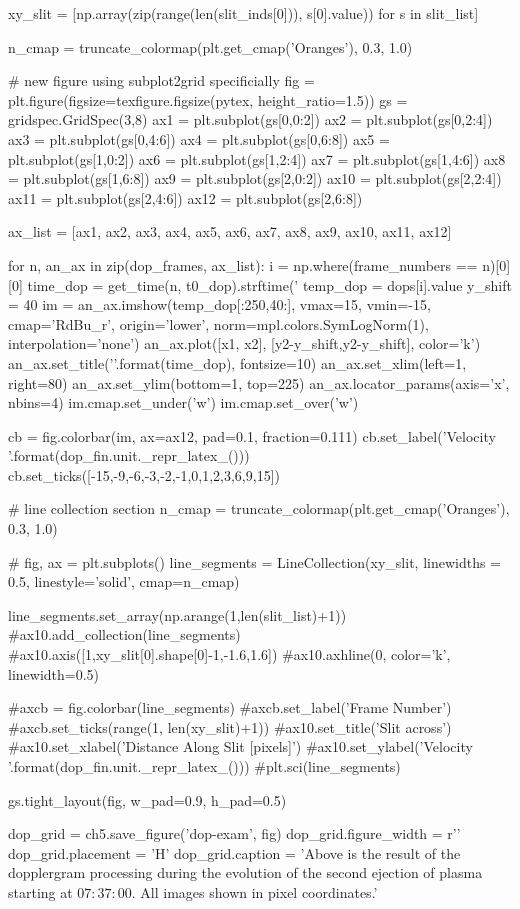 \begin{pycode}[chapter5]
xy_slit = [np.array(zip(range(len(slit_inds[0])), s[0].value)) for s in slit_list]


n_cmap = truncate_colormap(plt.get_cmap('Oranges'), 0.3, 1.0)


# new figure using subplot2grid specificially
fig = plt.figure(figsize=texfigure.figsize(pytex, height_ratio=1.5))
gs = gridspec.GridSpec(3,8)
ax1 = plt.subplot(gs[0,0:2])
ax2 = plt.subplot(gs[0,2:4])
ax3 = plt.subplot(gs[0,4:6])
ax4 = plt.subplot(gs[0,6:8])
ax5 = plt.subplot(gs[1,0:2])
ax6 = plt.subplot(gs[1,2:4])
ax7 = plt.subplot(gs[1,4:6])
ax8 = plt.subplot(gs[1,6:8])
ax9 = plt.subplot(gs[2,0:2])
ax10 = plt.subplot(gs[2,2:4])
ax11 = plt.subplot(gs[2,4:6])
ax12 = plt.subplot(gs[2,6:8])
 
ax_list = [ax1, ax2, ax3, ax4, ax5, ax6,
           ax7, ax8, ax9, ax10, ax11, ax12]

for n, an_ax in zip(dop_frames, ax_list):
    i = np.where(frame_numbers == n)[0][0]
    time_dop = get_time(n, t0_dop).strftime('%
    temp_dop = dops[i].value
    y_shift = 40
    im = an_ax.imshow(temp_dop[:250,40:], vmax=15, vmin=-15,
                      cmap='RdBu_r', origin='lower',
                      norm=mpl.colors.SymLogNorm(1),
                      interpolation='none')
    an_ax.plot([x1, x2], [y2-y_shift,y2-y_shift], color='k')
    an_ax.set_title('{}'.format(time_dop), fontsize=10)
    an_ax.set_xlim(left=1, right=80)
    an_ax.set_ylim(bottom=1, top=225)
    an_ax.locator_params(axis='x', nbins=4)
    im.cmap.set_under('w')
    im.cmap.set_over('w')

cb = fig.colorbar(im, ax=ax12, pad=0.1, fraction=0.111)
cb.set_label('Velocity {}'.format(dop_fin.unit._repr_latex_()))
cb.set_ticks([-15,-9,-6,-3,-2,-1,0,1,2,3,6,9,15])

# line collection section
n_cmap = truncate_colormap(plt.get_cmap('Oranges'), 0.3, 1.0)

# fig, ax = plt.subplots()
line_segments = LineCollection(xy_slit,
                               linewidths = 0.5,
                               linestyle='solid',
                               cmap=n_cmap)

line_segments.set_array(np.arange(1,len(slit_list)+1))
#ax10.add_collection(line_segments)
#ax10.axis([1,xy_slit[0].shape[0]-1,-1.6,1.6])
#ax10.axhline(0, color='k', linewidth=0.5)

#axcb = fig.colorbar(line_segments)
#axcb.set_label('Frame Number')
#axcb.set_ticks(range(1, len(xy_slit)+1))
#ax10.set_title('Slit across')
#ax10.set_xlabel('Distance Along Slit [pixels]')
#ax10.set_ylabel('Velocity {}'.format(dop_fin.unit._repr_latex_()))
#plt.sci(line_segments)

gs.tight_layout(fig, w_pad=0.9, h_pad=0.5)

dop_grid = ch5.save_figure('dop-exam', fig)
dop_grid.figure_width = r'\textwidth'
dop_grid.placement = 'H'
dop_grid.caption = 'Above is the result of the dopplergram processing during the evolution of the second ejection of plasma starting at $07:37:00$. All images shown in pixel coordinates.'


\end{pycode}

